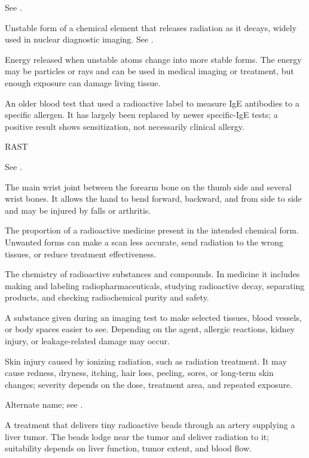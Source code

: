  See .

 Unstable form of a chemical element that releases radiation as it decays, widely used in nuclear diagnostic imaging. See .

 Energy released when unstable atoms change into more stable forms. The energy may be particles or rays and can be used in medical imaging or treatment, but enough exposure can damage living tissue.

 An older blood test that used a radioactive label to measure IgE antibodies to a specific allergen. It has largely been replaced by newer specific-IgE tests; a positive result shows sensitization, not necessarily clinical allergy.

\synonyms
RAST

 See .

 The main wrist joint between the forearm bone on the thumb side and several wrist bones. It allows the hand to bend forward, backward, and from side to side and may be injured by falls or arthritis.

 The proportion of a radioactive medicine present in the intended chemical form. Unwanted forms can make a scan less accurate, send radiation to the wrong tissues, or reduce treatment effectiveness.

 The chemistry of radioactive substances and compounds. In medicine it includes making and labeling radiopharmaceuticals, studying radioactive decay, separating products, and checking radiochemical purity and safety.

 A substance given during an imaging test to make selected tissues, blood vessels, or body spaces easier to see. Depending on the agent, allergic reactions, kidney injury, or leakage-related damage may occur.

 Skin injury caused by ionizing radiation, such as radiation treatment. It may cause redness, dryness, itching, hair loss, peeling, sores, or long-term skin changes; severity depends on the dose, treatment area, and repeated exposure.

 Alternate name; see .

 A treatment that delivers tiny radioactive beads through an artery supplying a liver tumor. The beads lodge near the tumor and deliver radiation to it; suitability depends on liver function, tumor extent, and blood flow.

